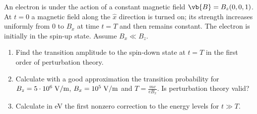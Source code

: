 \begin{esercizio}
   An electron is under the action of a constant magnetic field $\vb{B}=B_z(0,0,1)$. At $t=0$ a magnetic field along the $\hat{x}$ direction is turned on; its strength increases uniformly from $0$ to $B_x$ at time $t=T$ and then remains constant. The electron is initially in the spin-up state. Assume $B_x \ll B_z$.
   \begin{enumerate}[label=\alph*), leftmargin=0.6cm]
      \item Find the transition amplitude to the spin-down state at $t=T$ in the first order of perturbation theory.
      \item Calculate with a good approximation the transition probability for $B_z=5 \cdot 10^6 \rm \; V/m$, $B_x=10^5 \rm \; V/m$ and $T=\frac{mc}{e B_x}$. Is perturbation theory valid?
      \item Calculate in eV the first nonzero correction to the energy levels for $t \gg T$.
   \end{enumerate}
\end{esercizio}
